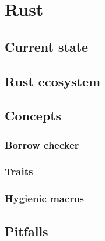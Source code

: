 \chapter{Rust}
\blindtext
\section{Current state}
\blindtext
\section{Rust ecosystem}
\blindtext
\section{Concepts}
\blindtext
\subsection{Borrow checker}
\blindtext
\subsection{Traits}
\blindtext
\subsection{Hygienic macros}
\blindtext
\section{Pitfalls}
\blindtext